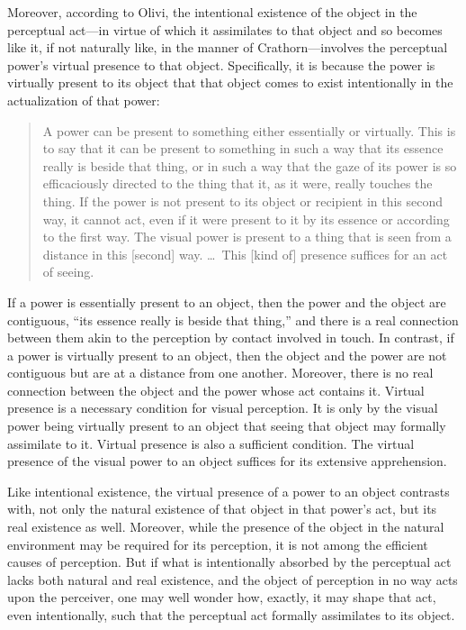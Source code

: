 \documentclass[12pt]{article}
\begin{document}
Moreover, according to Olivi, the intentional existence of the object in the perceptual act---in virtue of which it assimilates to that object and so becomes like it, if not naturally like, in the manner of Crathorn---involves the perceptual power's virtual presence to that object. Specifically, it is because the power is virtually present to its object that that object comes to exist intentionally in the actualization of that power: 
\begin{quote}
	A power can be present to something either essentially or virtually. This is to say that it can be present to something in such a way that its essence really is beside that thing, or in such a way that the gaze of its power is so efficaciously directed to the thing that it, as it were, really touches the thing. If the power is not present to its object or recipient in this second way, it cannot act, even if it were present to it by its essence or according to the first way. The visual power is present to a thing that is seen from a distance in this [second] way. \dots\ This [kind of] presence suffices for an act of seeing.
\end{quote}
If a power is essentially present to an object, then the power and the object are contiguous, ``its essence really is beside that thing,'' and there is a real connection between them akin to the perception by contact involved in touch. In contrast, if a power is virtually present to an object, then the object and the power are not contiguous but are at a distance from one another. Moreover, there is no real connection between the object and the power whose act contains it. Virtual presence is a necessary condition for visual perception. It is only by the visual power being virtually present to an object that seeing that object may formally assimilate to it. Virtual presence is also a sufficient condition. The virtual presence of the visual power to an object suffices for its extensive apprehension. 

Like intentional existence, the virtual presence of a power to an object contrasts with, not only the natural existence of that object in that power's act, but its real existence as well. Moreover, while the presence of the object in the natural environment may be required for its perception, it is not among the efficient causes of perception. But if what is intentionally absorbed by the perceptual act lacks both natural and real existence, and the object of perception in no way acts upon the perceiver, one may well wonder how, exactly, it may shape that act, even intentionally, such that the perceptual act formally assimilates to its object.
\end{document}

